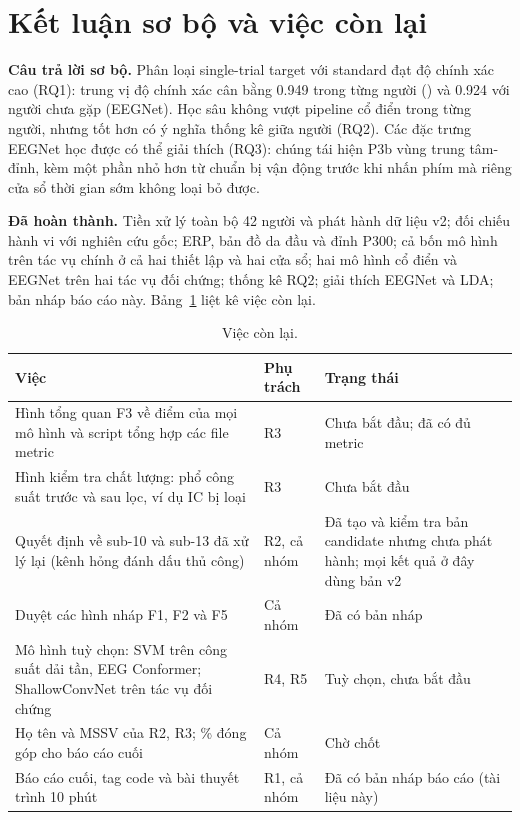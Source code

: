 \section{Kết luận sơ bộ và việc còn lại}
\label{ch:conclusion}

\textbf{Câu trả lời sơ bộ.} Phân loại single-trial target với standard đạt độ chính xác cao (RQ1): trung vị độ chính xác cân bằng 0.949 trong từng người () và 0.924 với người chưa gặp (EEGNet). Học sâu không vượt pipeline cổ điển trong từng người, nhưng tốt hơn có ý nghĩa thống kê giữa người (RQ2). Các đặc trưng EEGNet học được có thể giải thích (RQ3): chúng tái hiện P3b vùng trung tâm-đỉnh, kèm một phần nhỏ hơn từ chuẩn bị vận động trước khi nhấn phím mà riêng cửa sổ thời gian sớm không loại bỏ được.

\textbf{Đã hoàn thành.} Tiền xử lý toàn bộ 42 người và phát hành dữ liệu v2; đối chiếu hành vi với nghiên cứu gốc; ERP, bản đồ da đầu và đỉnh P300; cả bốn mô hình trên tác vụ chính ở cả hai thiết lập và hai cửa sổ; hai mô hình cổ điển và EEGNet trên hai tác vụ đối chứng; thống kê RQ2; giải thích EEGNet và LDA; bản nháp báo cáo này. Bảng~\ref{tab:remaining} liệt kê việc còn lại.

\begin{table}[H]
\centering
\small
\caption{Việc còn lại.}
\label{tab:remaining}
\begin{tabularx}{\linewidth}{>{\raggedright\arraybackslash}X>{\raggedright\arraybackslash}p{1.8cm}>{\raggedright\arraybackslash}p{5.2cm}}
\toprule
\textbf{Việc} & \textbf{Phụ trách} & \textbf{Trạng thái} \\
\midrule
Hình tổng quan F3 về điểm của mọi mô hình và script tổng hợp các file metric & R3 & Chưa bắt đầu; đã có đủ metric \\
Hình kiểm tra chất lượng: phổ công suất trước và sau lọc, ví dụ IC bị loại & R3 & Chưa bắt đầu \\
Quyết định về sub-10 và sub-13 đã xử lý lại (kênh hỏng đánh dấu thủ công) & R2, cả nhóm & Đã tạo và kiểm tra bản candidate nhưng chưa phát hành; mọi kết quả ở đây dùng bản v2 \\
Duyệt các hình nháp F1, F2 và F5 & Cả nhóm & Đã có bản nháp \\
Mô hình tuỳ chọn: SVM trên công suất dải tần, EEG Conformer; ShallowConvNet trên tác vụ đối chứng & R4, R5 & Tuỳ chọn, chưa bắt đầu \\
Họ tên và MSSV của R2, R3; \% đóng góp cho báo cáo cuối & Cả nhóm & Chờ chốt \\
Báo cáo cuối, tag code và bài thuyết trình 10 phút & R1, cả nhóm & Đã có bản nháp báo cáo (tài liệu này) \\
\bottomrule
\end{tabularx}
\end{table}

